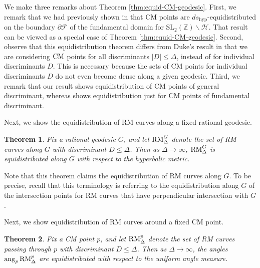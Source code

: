\documentclass[11pt,letterpaper,reqno]{amsart}
\newtheorem{theorem}{Theorem}[section]
\numberwithin{equation}{section}
\numberwithin{figure}{section}
\numberwithin{table}{section}
\newcommand{\ZZ}{\mathbb{Z}}
\newcommand{\SL}{\text{SL}}
\newcommand{\FF}{\mathcal{F}}
\newcommand{\HH}{\mathcal{H}}
\newcommand{\CM}{\textnormal{CM}}
\newcommand{\RM}{\textnormal{RM}}
\begin{document}
We make three remarks about Theorem \ref{thm:equid-CM-geodesic}.
First, we remark that we had previously shown in \cite[Theorem 1.1]{boundary-CM-points} that CM points are $ds_\text{hyp}$-equidistributed on the boundary $\partial \FF$ of the fundamental domain for $\SL_2(\ZZ)\backslash\HH$. That result can be viewed as a special case of Theorem \ref{thm:equid-CM-geodesic}.
Second, observe that this equidistribution theorem differs from Duke's result \cite[Theorem 1]{duke} in that we are considering $\CM$ points for all discriminants $|D| \le \Delta$, instead of for individual discriminants $D$. This is necessary because the sets of CM points for individual discriminants $D$ do not even become dense along a given geodesic. 
Third, we remark that our result shows equidistribution of CM points of general discriminant, whereas \cite[Theorem 1]{duke} shows equidistribution just for CM points of fundamental discriminant.



Next, we show the equidistribution of RM curves along a fixed rational geodesic.
\begin{theorem} \label{thm:equid-RM-geodesic}
    Fix a rational geodesic $G$, and let 
    $\RM^{G}_{\Delta}$ denote the set of RM curves along $G$ with discriminant $D \le \Delta$. 
    Then as $\Delta \to \infty$, $\RM^{G}_{\Delta}$ is equidistributed along $G$ with respect to the hyperbolic metric.
\end{theorem}
Note that this theorem claims the equidistribution of RM curves along $G$.
To be precise, recall that this terminology is referring to the equidistribution along $G$ of the intersection points for RM curves that have perpendicular intersection with $G$.


Next, we show equidistribution of RM curves around a fixed CM point. 
\begin{theorem} 
    \label{thm:equid-RM-fixedpt}
    Fix a CM point $p$, and let 
    $\RM^p_{\Delta}$ denote the set of RM curves passing through $p$ with discriminant $D \le \Delta$. 
    Then as $\Delta \to \infty$, the angles $\mathrm{ang}_p\, \RM^p_{\Delta}$ are equidistributed with respect to the uniform angle measure.
\end{theorem}
\end{document}
